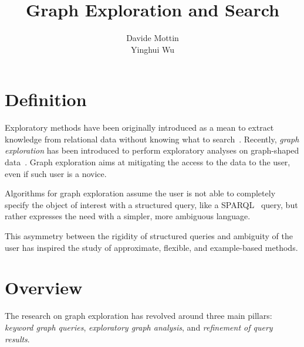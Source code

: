 \documentclass[graybox, natbib, nosecnum, twocolumn]{svmult}
\begin{document}
\title*{Graph Exploration and Search}
\author{Davide Mottin\\ Yinghui Wu}
%
%
\maketitle


\section{Definition}

Exploratory methods have been originally introduced as a mean to extract knowledge from relational data without knowing what to search~\citep{idreos2015overview}. 
Recently, \emph{graph exploration} has been introduced to perform exploratory analyses on graph-shaped data~\citep{mottin2017graph}. 
Graph exploration aims at mitigating the access to the data to the user, even if such user is a novice. 

Algorithms for graph exploration assume the user is not able to completely specify the object of interest with  a structured query, like a SPARQL~\citep{prud2006sparql} query, but rather expresses the need with a simpler, more ambiguous language.

This asymmetry between the rigidity of structured queries and ambiguity of the user has inspired the study of approximate, flexible, and example-based methods. 


\section{Overview}

The research on graph exploration has revolved around three main pillars: \emph{keyword graph queries}, \emph{exploratory graph analysis}, and \emph{refinement of query results}.  
\end{document}
